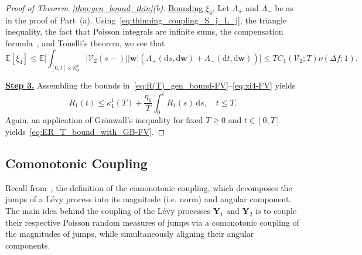 \documentclass[en,oneside,bbfont,article]{amsart}
\theoremstyle{remark}
\theoremstyle{definition}
\theoremstyle{definition}
\newcommand{\V}{\bm{\mathcal{V}}}
\newcommand\R{\mathbb{R}}
\newcommand\E{\mathds{E}}
\newcommand\1{\mathds{1}}
\renewcommand\le{\leqslant}
\renewcommand\ge{\geqslant}
\newcommand{\D}{\mathrm{d}}
\newcommand{\mft}{{\mathfrak{t}}}
\begin{document}
\begin{proof}[Proof of Theorem~\ref{thm:gen_bound_thin}(b)]
{\underline{Bounding $\xi_4$.}} 
Let $\Lambda_+$ and $\Lambda_-$ be as in the proof of Part~(a). Using~\eqref{eq:thinning_coupling_S_j_L_j}, the triangle inequality, the fact that Poisson integrals are infinite sums, the compensation formula~\cite[Thm~10.21]{MR4226142}, and Tonelli's theorem, we see that
\begin{equation}
\label{eq:xi4-FV}
\E[\xi_{4}]
\le\E\bigg[\int_{[0,t]\times\R^d_{\bm0}}|\V_2(s-)| |\bm{w}|(\Lambda_+(\D s,\D\bm{w})+\Lambda_-(\D t,\D\bm{w}))\bigg]
\le TC_1(\V_2;T) \nu(\Delta f;1).
\end{equation} 

\underline{\textbf{Step 3.}} Assembling the bounds in~\eqref{eq:R(T)_gen_bound-FV}--\eqref{eq:xi4-FV} yields
\begin{equation*}
R_1(t)
\le \kappa_1^\mft(T) + \frac{\eta_1}{T} \int_0^t R_1(s)\,\D s,
\quad t\le T.
\end{equation*}
Again, an application of Gr\"onwall's inequality for fixed $T\ge 0$ and $t\in[0,T]$ yields~\eqref{eq:ER_T_bound_with_GB-FV}.
\end{proof}

\subsection{Comonotonic Coupling}\label{sec:comonot_coup}
Recall from~\cite[Sec.~3.2]{WassersteinPaper}, the definition of the comonotonic coupling, which decomposes the jumps of a L\'evy process into its magnitude (i.e. norm) and angular component. The main idea behind the coupling of the L\'evy processes $\bm{Y}_1$ and $\bm{Y}_2$ is to couple their respective Poisson random measures of jumps via a comonotonic coupling of the magnitudes of jumps, while simultaneously aligning their angular components. 
\end{document}
